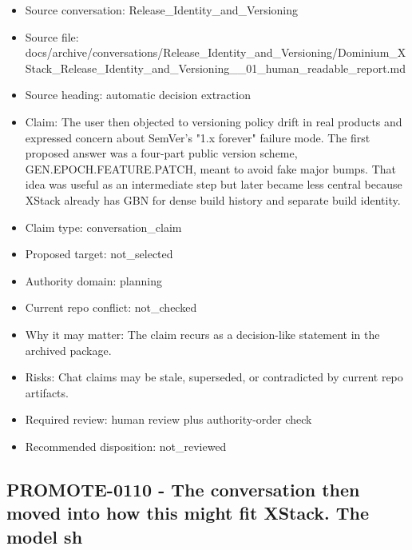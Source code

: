 \documentclass[11pt,a4paper]{report}
\begin{document}
\begin{itemize}
\item Source conversation: Release\_Identity\_and\_Versioning
\item Source file: docs/archive/conversations/Release\_Identity\_and\_Versioning/Dominium\_XStack\_Release\_Identity\_and\_Versioning\_\_01\_human\_readable\_report.md
\item Source heading: automatic decision extraction
\item Claim: The user then objected to versioning policy drift in real products and expressed concern about SemVer's "1.x forever" failure mode. The first proposed answer was a four-part public version scheme, GEN.EPOCH.FEATURE.PATCH, meant to avoid fake major bumps. That idea was useful as an intermediate step but later became less central because XStack already has GBN for dense build history and separate build identity.
\item Claim type: conversation\_claim
\item Proposed target: not\_selected
\item Authority domain: planning
\item Current repo conflict: not\_checked
\item Why it may matter: The claim recurs as a decision-like statement in the archived package.
\item Risks: Chat claims may be stale, superseded, or contradicted by current repo artifacts.
\item Required review: human review plus authority-order check
\item Recommended disposition: not\_reviewed
\end{itemize}

\subsection{PROMOTE-0110 - The conversation then moved into how this might fit XStack. The model sh}
\end{document}
